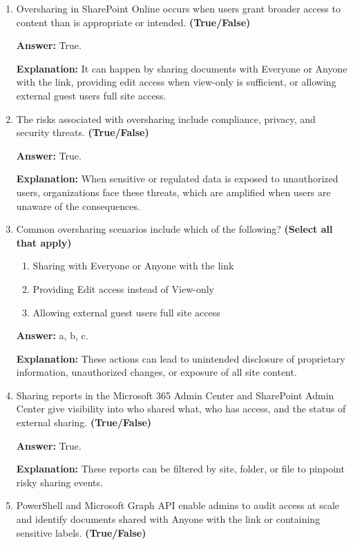 \documentclass[10pt]{article}
\begin{document}
\begin{enumerate}[leftmargin=*]

\item Oversharing in SharePoint Online occurs when users grant broader access to content than is appropriate or intended. \textbf{(True/False)}

\textbf{Answer:} True.

\textbf{Explanation:} It can happen by sharing documents with Everyone or Anyone with the link, providing edit access when view-only is sufficient, or allowing external guest users full site access.

\item The risks associated with oversharing include compliance, privacy, and security threats. \textbf{(True/False)}

\textbf{Answer:} True.

\textbf{Explanation:} When sensitive or regulated data is exposed to unauthorized users, organizations face these threats, which are amplified when users are unaware of the consequences.

\item Common oversharing scenarios include which of the following? \textbf{(Select all that apply)}
\begin{enumerate}[label=\alph*., leftmargin=1.5em]
\item Sharing with Everyone or Anyone with the link
\item Providing Edit access instead of View-only
\item Allowing external guest users full site access
\end{enumerate}
\textbf{Answer:} a, b, c.

\textbf{Explanation:} These actions can lead to unintended disclosure of proprietary information, unauthorized changes, or exposure of all site content.

\item Sharing reports in the Microsoft 365 Admin Center and SharePoint Admin Center give visibility into who shared what, who has access, and the status of external sharing. \textbf{(True/False)}

\textbf{Answer:} True.

\textbf{Explanation:} These reports can be filtered by site, folder, or file to pinpoint risky sharing events.

\item PowerShell and Microsoft Graph API enable admins to audit access at scale and identify documents shared with Anyone with the link or containing sensitive labels. \textbf{(True/False)}


\end{enumerate}
\end{document}
